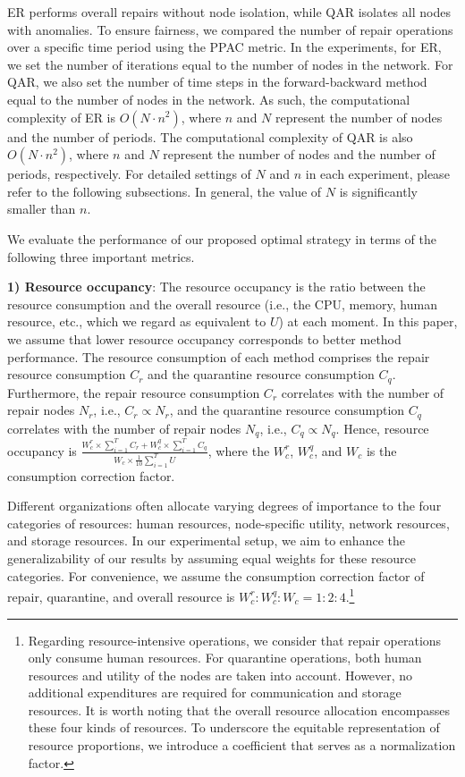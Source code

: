 \documentclass[lettersize,journal]{IEEEtran}
\begin{document}
ER performs overall repairs without node isolation, while QAR isolates all nodes with anomalies. To ensure fairness, we compared the number of repair operations over a specific time period using the PPAC metric. In the experiments, for ER, we set the number of iterations equal to the number of nodes in the network. For QAR, we also set the number of time steps in the forward-backward method \cite{lapidus1971numerical,yangEffectiveQuarantineRecovery2021} equal to the number of nodes in the network. As such, the computational complexity of ER is $O(N\cdot n^2)$, where $n$ and $N$ represent the number of nodes and the number of periods. The computational complexity of QAR is also $O(N\cdot n^2)$, where $n$ and $N$ represent the number of nodes and the number of periods, respectively. For detailed settings of $N$ and $n$ in each experiment, please refer to the following subsections. In general, the value of $N$ is significantly smaller than $n$.\par
 We evaluate the performance of our proposed optimal strategy in terms of the following three important metrics.\par
\textbf{1) Resource occupancy}: The resource occupancy is the ratio between the resource consumption and the overall resource (i.e., the CPU, memory, human resource, etc., which we regard as equivalent to $U$) at each moment. In this paper, we assume that lower resource occupancy corresponds to better method performance. The resource consumption of each method comprises the repair resource consumption $C_r$ and the quarantine resource consumption $C_q$. Furthermore, the repair resource consumption $C_r$ correlates with the number of repair nodes $N_r$, i.e.,  $C_r \propto N_r$, and the quarantine resource consumption $C_q$ correlates with the number of repair nodes $N_q$, i.e.,  $C_q \propto N_q$. Hence, resource occupancy is $\frac{W_c^r\times\sum_{i=1}^{T}C_r+W_c^q\times\sum_{i=1}^{T}C_q}{W_c\times\frac{1}{10} \sum_{i=1}^{T}U}$, where the $W_c^r$, $W_c^q$, and $W_c$ is the consumption correction factor.\par
Different organizations often allocate varying degrees of importance to the four categories of resources: human resources, node-specific utility, network resources, and storage resources. In our experimental setup, we aim to enhance the generalizability of our results by assuming equal weights for these resource categories. For convenience, we assume the consumption correction factor of repair, quarantine, and overall resource is $W_c^r:W_c^q: W_c=1:2:4$.\footnote{Regarding resource-intensive operations, we consider that repair operations only consume human resources. For quarantine operations, both human resources and utility of the nodes are taken into account. However, no additional expenditures are required for communication and storage resources. It is worth noting that the overall resource allocation encompasses these four kinds of resources. To underscore the equitable representation of resource proportions, we introduce a coefficient that serves as a normalization factor.} \par
\end{document}
